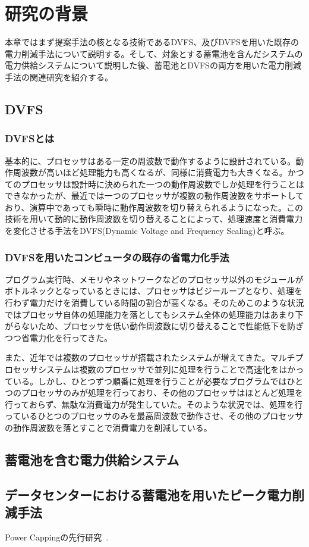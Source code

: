\chapter{研究の背景}
\label{chap:background}

本章ではまず提案手法の核となる技術であるDVFS、及びDVFSを用いた既存の電力削減手法について説明する。そして、対象とする蓄電池を含んだシステムの電力供給システムについて説明した後、蓄電池とDVFSの両方を用いた電力削減手法の関連研究を紹介する。

\section{DVFS}
\label{sec:dvfs}

\subsection{DVFSとは}

基本的に、プロセッサはある一定の周波数で動作するように設計されている。動作周波数が高いほど処理能力も高くなるが、同様に消費電力も大きくなる。かつてのプロセッサは設計時に決められた一つの動作周波数でしか処理を行うことはできなかったが、最近では一つのプロセッサが複数の動作周波数をサポートしており、演算中であっても瞬時に動作周波数を切り替えられるようになった。この技術を用いて動的に動作周波数を切り替えることによって、処理速度と消費電力を変化させる手法をDVFS(Dynamic Voltage and Frequency Scaling)と呼ぶ。


\subsection{DVFSを用いたコンピュータの既存の省電力化手法}

プログラム実行時、メモリやネットワークなどのプロセッサ以外のモジュールがボトルネックとなっているときには、プロセッサはビジーループとなり、処理を行わず電力だけを消費している時間の割合が高くなる。そのためこのような状況ではプロセッサ自体の処理能力を落としてもシステム全体の処理能力はあまり下がらないため、プロセッサを低い動作周波数に切り替えることで性能低下を防ぎつつ省電力化を行ってきた。

また、近年では複数のプロセッサが搭載されたシステムが増えてきた。マルチプロセッサシステムは複数のプロセッサで並列に処理を行うことで高速化をはかっている。しかし、ひとつずつ順番に処理を行うことが必要なプログラムではひとつのプロセッサのみが処理を行っており、その他のプロセッサはほとんど処理を行っておらず、無駄な消費電力が発生していた。そのような状況では、処理を行っているひとつのプロセッサのみを最高周波数で動作させ、その他のプロセッサの動作周波数を落とすことで消費電力を削減している。




\section{蓄電池を含む電力供給システム}
\label{sec:ups}


\section{データセンターにおける蓄電池を用いたピーク電力削減手法}
\label{sec:capping}

Power Cappingの先行研究~\cite{Fan:2007:PPW:1273440.1250665}.
